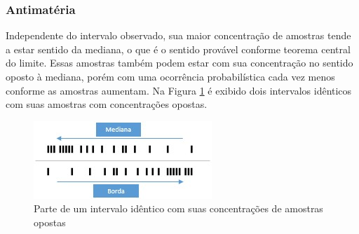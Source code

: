 \subsubsection{Antimatéria}
Independente do intervalo observado, sua maior concentração de amostras tende a estar sentido da mediana, o que é o sentido provável conforme teorema central do limite. Essas amostras também podem estar com sua concentração no sentido oposto à mediana, porém com uma ocorrência probabilística cada vez menos conforme as amostras aumentam. Na Figura \ref{fig:consciousness_concentration_of_opposite_samples} é exibido dois intervalos idênticos com suas amostras com concentrações opostas.
	\begin{figure}[H]
	\caption{Parte de um intervalo idêntico com suas concentrações de amostras opostas}
	\label{fig:consciousness_concentration_of_opposite_samples}
	\centering
	\includegraphics[scale=1]{sections/images/consciousness_concentration_of_opposite_samples.jpg}
	\end{figure}

